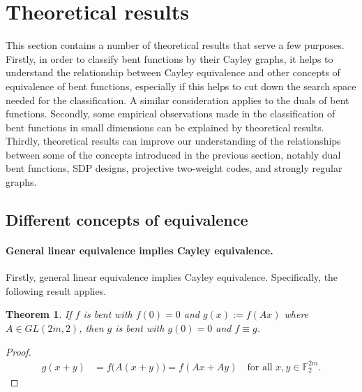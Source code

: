 \documentclass[12pt,a4paper]{article}
\newcommand{\mb}[1]{\mathbb{#1}}
\newcommand{\F}{\mb{F}}
\newtheorem{Theorem}{Theorem}
\begin{document}
\section{Theoretical results}
\label{sec-Results}

This section contains a number of theoretical results that serve a few purposes.
Firstly, in order to classify bent functions by their Cayley graphs,
it helps to understand the relationship between Cayley equivalence and other concepts of equivalence
of bent functions, especially if this helps to cut down the search space needed for the
classification.
A similar consideration applies to the duals of bent functions.
Secondly, some empirical observations made in the classification of bent functions in small
dimensions can be explained by theoretical results.
Thirdly, theoretical results can improve our understanding of the relationships between
some of the concepts introduced in the previous section, notably dual bent functions, SDP designs,
projective two-weight codes, and strongly regular graphs.

\subsection{Different concepts of equivalence}

\paragraph*{General linear equivalence implies Cayley equivalence.}

Firstly, general linear equivalence implies Cayley equivalence.
Specifically, the following result applies.
\begin{Theorem}
\label{th-Linear-Cayley}
If $f$ is bent with $f(0)=0$ and $g(x) := f(A x)$ where $A \in GL(2m,2)$,
then $g$ is bent with $g(0)=0$ and $f \equiv g$.
\end{Theorem}
\begin{proof}
\begin{align*}
g(x+y) &= f\big(A(x+y)\big) = f(A x + A y)\quad \text{for all~} x,y \in \F_2^{2m}.
\end{align*}
\end{proof}


\end{document}
